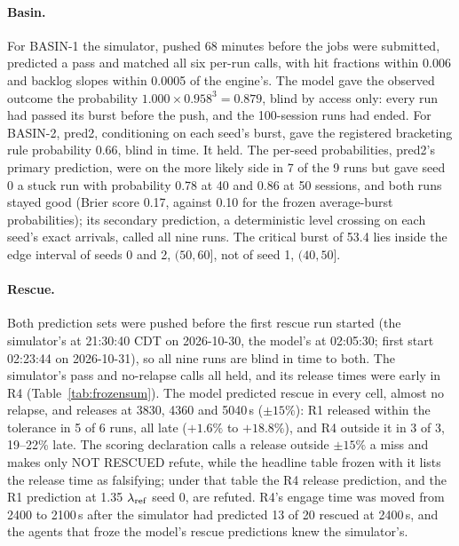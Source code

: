 \paragraph{Basin.} For BASIN-1 the simulator, pushed 68 minutes before the jobs were submitted, predicted a pass and matched all six per-run calls, with hit fractions within 0.006 and backlog slopes within 0.0005\sps{} of the engine's. The model gave the observed outcome the probability $1.000\times0.958^3=0.879$, blind by access only: every run had passed its burst before the push, and the 100-session runs had ended. For BASIN-2, pred2, conditioning on each seed's burst, gave the registered bracketing rule probability 0.66, blind in time. It held. The per-seed probabilities, pred2's primary prediction, were on the more likely side in 7 of the 9 runs but gave seed 0 a stuck run with probability 0.78 at 40 and 0.86 at 50 sessions, and both runs stayed good (Brier score 0.17, against 0.10 for the frozen average-burst probabilities); its secondary prediction, a deterministic level crossing on each seed's exact arrivals, called all nine runs. The critical burst of 53.4 lies inside the edge interval of seeds 0 and 2, $(50,60]$, not of seed 1, $(40,50]$.

\paragraph{Rescue.} Both prediction sets were pushed before the first rescue run started (the simulator's at 21:30:40 CDT on 2026-10-30, the model's at 02:05:30; first start 02:23:44 on 2026-10-31), so all nine runs are blind in time to both. The simulator's pass and no-relapse calls all held, and its release times were early in R4 (Table~\ref{tab:frozensum}). The model predicted rescue in every cell, almost no relapse, and releases at 3830, 4360 and 5040\,s ($\pm15\%$): R1 released within the tolerance in 5 of 6 runs, all late ($+1.6\%$ to $+18.8\%$), and R4 outside it in 3 of 3, 19--22\% late. The scoring declaration calls a release outside $\pm15\%$ a miss and makes only NOT RESCUED refute, while the headline table frozen with it lists the release time as falsifying; under that table the R4 release prediction, and the R1 prediction at 1.35 $\lambda_{\mathrm{ref}}$ seed 0, are refuted. R4's engage time was moved from 2400 to 2100\,s after the simulator had predicted 13 of 20 rescued at 2400\,s, and the agents that froze the model's rescue predictions knew the simulator's.

